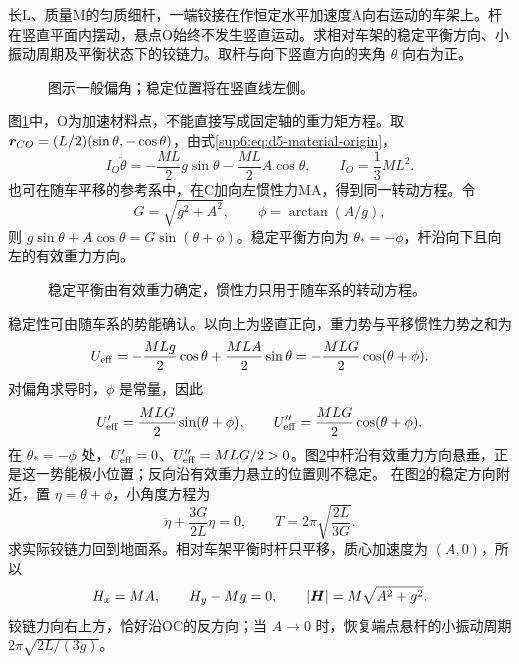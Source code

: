 \begin{exercise}[加速悬点上的复摆]\label{deep6:problem-exercise-11}\label{deep6:ex:d5-h11}
长L、质量M的匀质细杆，一端铰接在作恒定水平加速度A向右运动的车架上。杆在竖直平面内摆动，悬点O始终不发生竖直运动。求相对车架的稳定平衡方向、小振动周期及平衡状态下的铰链力。取杆与向下竖直方向的夹角 $\theta$ 向右为正。
\end{exercise}
\begin{figure}[H]\centering
{}
\caption{图示一般偏角；稳定位置将在竖直线左侧。}\label{deep6:fig:d5-h11-q}
\end{figure}
\begin{solution}
图\ref{deep6:fig:d5-h11-q}中，O为加速材料点，不能直接写成固定轴的重力矩方程。取 $\bm{r}_{CO}=(L/2)(\sin\theta,-\cos\theta)$，由式\eqref{sup6:eq:d5-material-origin}，
\[
I_O\ddot\theta=-\frac{ML}2g\sin\theta
-\frac{ML}2A\cos\theta,
\qquad I_O=\frac13ML^2.
\]
也可在随车平移的参考系中，在C加向左惯性力MA，得到同一转动方程。令
\[
G=\sqrt{g^2+A^2},\qquad \phi=\arctan(A/g),
\]
则 $g\sin\theta+A\cos\theta=G\sin(\theta+\phi)$。稳定平衡方向为 $\theta_*=-\phi$，杆沿向下且向左的有效重力方向。
\begin{figure}[H]\centering
{}
\caption{稳定平衡由有效重力确定，惯性力只用于随车系的转动方程。}\label{deep6:fig:d5-h11-s}
\end{figure}
稳定性可由随车系的势能确认。以向上为竖直正向，重力势与平移惯性力势之和为
\[
U_{\rm eff}=-\frac{MLg}{2}\cos\theta+\frac{MLA}{2}\sin\theta
=-\frac{MLG}{2}\cos(\theta+\phi).
\]
对偏角求导时，$\phi$ 是常量，因此
\[
U_{\rm eff}'=\frac{MLG}{2}\sin(\theta+\phi),\qquad
U_{\rm eff}''=\frac{MLG}{2}\cos(\theta+\phi).
\]
在 $\theta_*=-\phi$ 处，$U_{\rm eff}'=0$、$U_{\rm eff}''=MLG/2>0$。图\ref{deep6:fig:d5-h11-s}中杆沿有效重力方向悬垂，正是这一势能极小位置；反向沿有效重力悬立的位置则不稳定。
在图\ref{deep6:fig:d5-h11-s}的稳定方向附近，置 $\eta=\theta+\phi$，小角度方程为
\[
\ddot\eta+\frac{3G}{2L}\eta=0,\qquad
T=2\pi\sqrt{\frac{2L}{3G}}.
\]
求实际铰链力回到地面系。相对车架平衡时杆只平移，质心加速度为 $(A,0)$，所以
\[
H_x=MA,\qquad H_y-Mg=0,
\qquad |\bm{H}|=M\sqrt{A^2+g^2}.
\]
铰链力向右上方，恰好沿OC的反方向；当 $A\to0$ 时，恢复端点悬杆的小振动周期 $2\pi\sqrt{2L/(3g)}$。
\end{solution}


